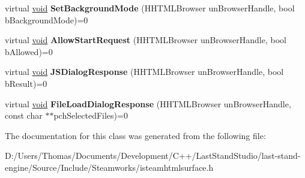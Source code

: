 \begin{DoxyCompactItemize}
\item 
\hypertarget{classISteamHTMLSurface_aabfc7673e6f7dfddcc1002d3a4865de6}{}virtual \hyperlink{SDL__audio_8h_a52835ae37c4bb905b903cbaf5d04b05f}{void} {\bfseries Set\+Background\+Mode} (H\+H\+T\+M\+L\+Browser un\+Browser\+Handle, bool b\+Background\+Mode)=0\label{classISteamHTMLSurface_aabfc7673e6f7dfddcc1002d3a4865de6}

\item 
\hypertarget{classISteamHTMLSurface_ab53e70f8779fab06069f782b8777d845}{}virtual \hyperlink{SDL__audio_8h_a52835ae37c4bb905b903cbaf5d04b05f}{void} {\bfseries Allow\+Start\+Request} (H\+H\+T\+M\+L\+Browser un\+Browser\+Handle, bool b\+Allowed)=0\label{classISteamHTMLSurface_ab53e70f8779fab06069f782b8777d845}

\item 
\hypertarget{classISteamHTMLSurface_a916bbdca59de2a048b850a12d17e15d9}{}virtual \hyperlink{SDL__audio_8h_a52835ae37c4bb905b903cbaf5d04b05f}{void} {\bfseries J\+S\+Dialog\+Response} (H\+H\+T\+M\+L\+Browser un\+Browser\+Handle, bool b\+Result)=0\label{classISteamHTMLSurface_a916bbdca59de2a048b850a12d17e15d9}

\item 
\hypertarget{classISteamHTMLSurface_af40eb06df1b74a6b5706dbf9cc7748f6}{}virtual \hyperlink{SDL__audio_8h_a52835ae37c4bb905b903cbaf5d04b05f}{void} {\bfseries File\+Load\+Dialog\+Response} (H\+H\+T\+M\+L\+Browser un\+Browser\+Handle, const char $\ast$$\ast$pch\+Selected\+Files)=0\label{classISteamHTMLSurface_af40eb06df1b74a6b5706dbf9cc7748f6}

\end{DoxyCompactItemize}


The documentation for this class was generated from the following file\+:\begin{DoxyCompactItemize}
\item 
D\+:/\+Users/\+Thomas/\+Documents/\+Development/\+C++/\+Last\+Stand\+Studio/last-\/stand-\/engine/\+Source/\+Include/\+Steamworks/isteamhtmlsurface.\+h\end{DoxyCompactItemize}
